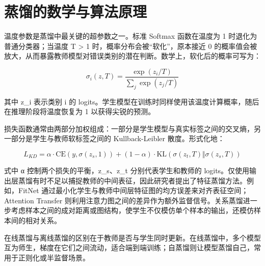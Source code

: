 \chapter{蒸馏的数学与算法原理}
温度参数是蒸馏中最关键的超参数之一。标准 Softmax 函数在温度为 1 时退化为普通分类器；当温度 T > 1 时，概率分布会被“软化”，原本接近 0 的概率值会被放大，从而暴露教师模型对错误类别的潜在判断。数学上，软化后的概率可写为：\par
$$ \sigma_i(z,T)=\frac{\exp(z_i/T)}{\sum_j\exp(z_j/T)} $$\par
其中 z\_{}i 表示类别 i 的 logits。学生模型在训练时同样使用该温度计算概率，随后在推理阶段将温度恢复为 1 以获得尖锐的预测。\par
损失函数通常由两部分加权组成：一部分是学生模型与真实标签之间的交叉熵，另一部分是学生与教师软标签之间的 Kullback-Leibler 散度。形式化地：\par
$$ L_{KD}=\alpha\cdot\text{CE}(y,\sigma(z_s,1))+(1-\alpha)\cdot\text{KL}(\sigma(z_t,T)\Vert\sigma(z_s,T)) $$\par
式中 α 控制两个损失的平衡，z\_{}s、z\_{}t 分别代表学生和教师的 logits。仅使用输出层蒸馏有时不足以捕捉教师的中间表征，因此研究者提出了特征蒸馏方法。例如，FitNet 通过最小化学生与教师中间层特征图的均方误差来对齐表征空间；Attention Transfer 则利用注意力图之间的差异作为额外监督信号。关系蒸馏进一步考虑样本之间的成对距离或图结构，使学生不仅模仿单个样本的输出，还模仿样本间的相对关系。\par
在线蒸馏与离线蒸馏的区别在于教师是否与学生同时更新。在线蒸馏中，多个模型互为师生，梯度在它们之间流动，适合端到端训练；自蒸馏则让模型蒸馏自己，常用于正则化或半监督场景。\par
